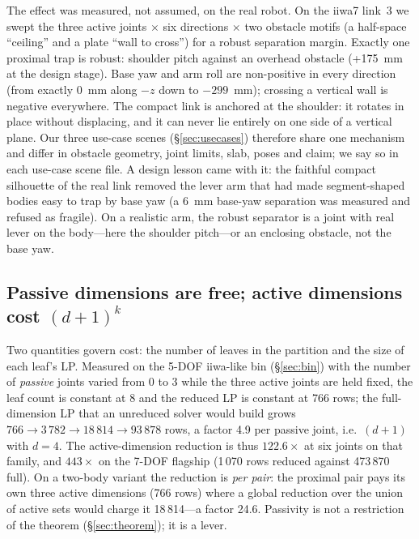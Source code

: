\documentclass[10pt,twocolumn,letterpaper]{article}
\begin{document}
The effect was measured, not assumed, on the real robot. On the iiwa7 link~3 we swept the three active joints $\times$ six directions $\times$ two obstacle motifs (a half-space ``ceiling'' and a plate ``wall to cross'') for a robust separation margin. Exactly one proximal trap is robust: shoulder pitch against an overhead obstacle (+175~mm at the design stage). Base yaw and arm roll are non-positive in every direction (from exactly 0~mm along $-z$ down to $-299$~mm); crossing a vertical wall is negative everywhere. The compact link is anchored at the shoulder: it rotates in place without displacing, and it can never lie entirely on one side of a vertical plane. Our three use-case scenes (\S\ref{sec:usecases}) therefore share one mechanism and differ in obstacle geometry, joint limits, slab, poses and claim; we say so in each use-case scene file. A design lesson came with it: the faithful compact silhouette of the real link removed the lever arm that had made segment-shaped bodies easy to trap by base yaw (a 6~mm base-yaw separation was measured and refused as fragile). On a realistic arm, the robust separator is a joint with real lever on the body---here the shoulder pitch---or an enclosing obstacle, not the base yaw.

\subsection{Passive dimensions are free; active dimensions cost $(d+1)^k$}\label{sec:costmodel}
Two quantities govern cost: the number of leaves in the partition and the size of each leaf's LP. Measured on the 5-DOF iiwa-like bin (\S\ref{sec:bin}) with the number of \emph{passive} joints varied from 0 to 3 while the three active joints are held fixed, the leaf count is constant at 8 and the reduced LP is constant at 766 rows; the full-dimension LP that an unreduced solver would build grows $766\to3\,782\to18\,814\to93\,878$ rows, a factor 4.9 per passive joint, i.e.\ $(d+1)$ with $d=4$. The active-dimension reduction is thus $122.6\times$ at six joints on that family, and $443\times$ on the 7-DOF flagship (1\,070 rows reduced against 473\,870 full). On a two-body variant the reduction is \emph{per pair}: the proximal pair pays its own three active dimensions (766 rows) where a global reduction over the union of active sets would charge it 18\,814---a factor 24.6. Passivity is not a restriction of the theorem (\S\ref{sec:theorem}); it is a lever.
\end{document}
